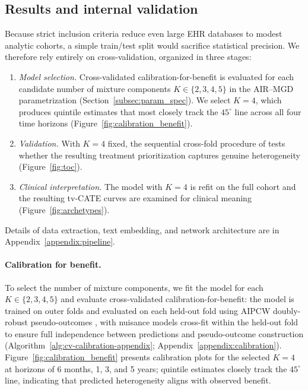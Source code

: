 \documentclass{article}
\begin{document}
\subsection{Results and internal validation}\label{subsec:results}

Because strict inclusion criteria reduce even large EHR databases to modest analytic cohorts, a simple train/test split would sacrifice statistical precision.
We therefore rely entirely on cross-validation, organized in three stages:
\begin{enumerate}[leftmargin=*,nosep]
  \item \emph{Model selection.} Cross-validated calibration-for-benefit is evaluated for each candidate number of mixture components $K \in \{2,3,4,5\}$ in the AIR--MGD parametrization (Section~\ref{subsec:param_spec}). We select $K = 4$, which produces quintile estimates that most closely track the $45^\circ$ line across all four time horizons (Figure~\ref{fig:calibration_benefit}).
  \item \emph{Validation.} With $K = 4$ fixed, the sequential cross-fold procedure of \citet{wager2024sequential} tests whether the resulting treatment prioritization captures genuine heterogeneity (Figure~\ref{fig:toc}).
  \item \emph{Clinical interpretation.} The model with $K = 4$ is refit on the full cohort and the resulting tv-CATE curves are examined for clinical meaning (Figure~\ref{fig:archetypes}).
\end{enumerate}
Details of data extraction, text embedding, and network architecture are in Appendix~\ref{appendix:pipeline}.

\paragraph{Calibration for benefit.}
To select the number of mixture components, we fit the model for each $K \in \{2,3,4,5\}$ and evaluate cross-validated calibration-for-benefit: the model is trained on outer folds and evaluated on each held-out fold using AIPCW doubly-robust pseudo-outcomes \citep{li2018balancing}, with nuisance models cross-fit within the held-out fold to ensure full independence between predictions and pseudo-outcome construction (Algorithm~\ref{alg:cv-calibration-appendix}; Appendix~\ref{appendix:calibration}).
Figure~\ref{fig:calibration_benefit} presents calibration plots for the selected $K = 4$ at horizons of 6 months, 1, 3, and 5 years; quintile estimates closely track the $45^\circ$ line, indicating that predicted heterogeneity aligns with observed benefit.
\end{document}
